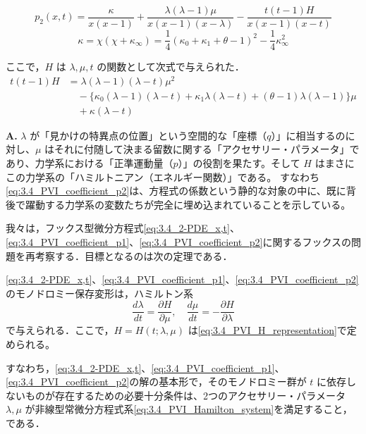 \begin{equation}\label{eq:3.4_PVI_coefficient_p2}
  p_2(x,t) = \frac{\kappa}{x(x-1)} + \frac{\lambda(\lambda-1)\mu}{x(x-1)(x-\lambda)} - \frac{t(t-1)H}{x(x-1)(x-t)}
\end{equation}
\[
  \kappa = \chi(\chi+\kappa_\infty) = \frac{1}{4}(\kappa_0+\kappa_1+\theta-1)^2 - \frac{1}{4}\kappa_\infty^2
\]

ここで，$H$ は $\lambda, \mu, t$ の関数として次式で与えられた．
\begin{align}\label{eq:3.4_PVI_H_representation}
  t(t-1)H &= \lambda(\lambda-1)(\lambda-t)\mu^2 \nonumber \\
  &\quad - \{\kappa_0(\lambda-1)(\lambda-t) + \kappa_1\lambda(\lambda-t) + (\theta-1)\lambda(\lambda-1)\} \mu \nonumber \\
  &\quad + \kappa(\lambda-t)
\end{align}

\begin{Q}
\textbf{A.} $\lambda$ が「見かけの特異点の位置」という空間的な「座標（$q$）」に相当するのに対し、$\mu$ はそれに付随して決まる留数に関する「アクセサリー・パラメータ」であり、力学系における「正準運動量（$p$）」の役割を果たす。そして $H$ はまさにこの力学系の「ハミルトニアン（エネルギー関数）」である。
すなわち\eqref{eq:3.4_PVI_coefficient_p2}は、方程式の係数という静的な対象の中に、既に背後で躍動する力学系の変数たちが完全に埋め込まれていることを示している。
\end{Q}

我々は，フックス型微分方程式\eqref{eq:3.4_2-PDE_x,t}、\eqref{eq:3.4_PVI_coefficient_p1}、\eqref{eq:3.4_PVI_coefficient_p2}に関するフックスの問題を再考察する．目標となるのは次の定理である．

\begin{theorem}
\eqref{eq:3.4_2-PDE_x,t}、\eqref{eq:3.4_PVI_coefficient_p1}、\eqref{eq:3.4_PVI_coefficient_p2}のモノドロミー保存変形は，ハミルトン系
\begin{equation}\label{eq:3.4_PVI_Hamilton_system}
  \frac{d\lambda}{dt} = \frac{\partial H}{\partial \mu}, \quad \frac{d\mu}{dt} = -\frac{\partial H}{\partial \lambda}
\end{equation}
で与えられる．ここで，$H=H(t;\lambda,\mu)$ は\eqref{eq:3.4_PVI_H_representation}で定められる。
\end{theorem}

すなわち，\eqref{eq:3.4_2-PDE_x,t}、\eqref{eq:3.4_PVI_coefficient_p1}、\eqref{eq:3.4_PVI_coefficient_p2}の解の基本形で，そのモノドロミー群が $t$ に依存しないものが存在するための必要十分条件は、2つのアクセサリー・パラメータ $\lambda, \mu$ が非線型常微分方程式系\eqref{eq:3.4_PVI_Hamilton_system}を満足すること，である．

